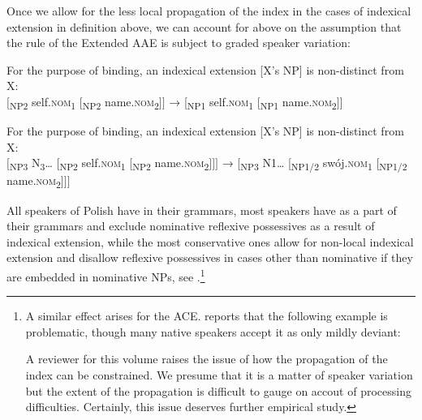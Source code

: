 \documentclass[output=paper,modfonts,nonflat
]{langsci/langscibook}
\begin{document}
Once we allow for the less local propagation of the index in the cases of indexical extension in definition  above, we can account for  above on the assumption that the rule of the Extended AAE is subject to graded speaker variation:
    
\z

\ea \label{ex:witkos:66}
For the purpose of binding, an indexical extension [X’s NP] is non-distinct from X:\\
$[$\textsubscript{NP2} self.\textsc{nom}\textsubscript{1} [\textsubscript{NP2} name.\textsc{nom}\textsubscript{2}$]]$ → [\textsubscript{NP1} self.\textsc{nom}\textsubscript{1} [\textsubscript{NP1} name.\textsc{nom}\textsubscript{2}$]]$\\
\z

\ea \label{ex:witkos:67}
For the purpose of binding, an indexical extension [X’s NP] is non-distinct from X:\\
$[$\textsubscript{NP3} N\textsubscript{3}{\dots} [\textsubscript{NP2} self.\textsc{nom}\textsubscript{1} [\textsubscript{NP2} name.\textsc{nom}\textsubscript{2}$]]]$ → [\textsubscript{NP3} N1{\dots} [\textsubscript{NP1/2} swój.\textsc{nom}\textsubscript{1} [\textsubscript{NP1/2} name.\textsc{nom}\textsubscript{2}$]]]$\\
\z

\noindent All speakers of Polish have  in their grammars, most speakers have  as a part of their grammars and exclude nominative reflexive possessives as a result of indexical extension, while the most conservative ones allow for non-local indexical extension and disallow reflexive possessives in cases other than nominative if they are embedded in nominative NPs, see .\footnote{\label{fn34}A similar effect arises for the ACE. \cite[82]{willim1989} reports that the following example is problematic, though many native speakers accept it as only mildly deviant:

\z

\noindent A reviewer for this volume raises the issue of how the propagation of the index can be constrained. We presume that it is a matter of speaker variation but the extent of the propagation is difficult to gauge on accout of processing difficulties. Certainly, this issue deserves further empirical study.}
\end{document}
